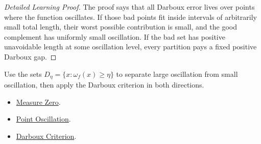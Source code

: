\begin{proof}[Detailed Learning Proof]
\LRAProofBodyStart
The proof says that all Darboux error lives over points where the function
oscillates. If those bad points fit inside intervals of arbitrarily small total
length, their worst possible contribution is small, and the good complement
has uniformly small oscillation. If the bad set has positive unavoidable
length at some oscillation level, every partition pays a fixed positive
Darboux gap.
\end{proof}
\begin{remark*}
Use the sets \(D_\eta=\{x:\omega_f(x)\ge\eta\}\) to separate large oscillation
from small oscillation, then apply the Darboux criterion in both directions.
\end{remark*}
\begin{dependencies}
\begin{itemize}
  \item \hyperref[def:measure-zero]{Measure Zero}.
  \item \hyperref[def:point-oscillation-integration]{Point Oscillation}.
  \item \hyperref[thm:darboux-criterion]{Darboux Criterion}.
\end{itemize}
\end{dependencies}
\clearpage
